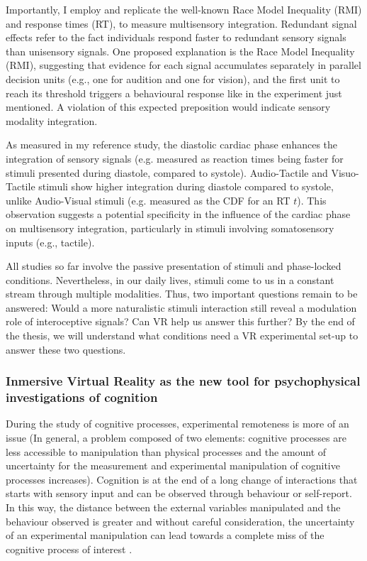 \documentclass[12pt,oneside,openright]{report}
\begin{document}
Importantly, I employ and replicate the well-known Race Model Inequality (RMI) and response times (RT), to measure multisensory integration. Redundant signal effects refer to the fact individuals respond faster to redundant sensory signals than unisensory signals. One proposed explanation is the Race Model Inequality (RMI), suggesting that evidence for each signal accumulates separately in parallel decision units (e.g., one for audition and one for vision), and the first unit to reach its threshold triggers a behavioural response like in the experiment just mentioned. A violation of this expected preposition would indicate sensory modality integration. 

As measured in my reference study, the diastolic cardiac phase enhances the integration of sensory signals (e.g. measured as reaction times being faster for stimuli presented during diastole, compared
to systole). Audio-Tactile and Visuo-Tactile stimuli show higher integration during diastole compared to systole, unlike Audio-Visual stimuli (e.g. measured as the CDF for an RT $t$). This observation suggests a potential specificity in the influence of the cardiac phase on multisensory integration, particularly in stimuli involving somatosensory inputs (e.g., tactile).

All studies so far involve the passive presentation of stimuli and phase-locked conditions. Nevertheless, in our daily lives, stimuli come to us in a constant stream through multiple modalities. Thus, two important questions remain to be answered: Would a more naturalistic stimuli interaction still reveal a modulation role of interoceptive signals? Can VR help us answer this further? By the end of the thesis, we will understand what conditions need a VR experimental set-up to answer these two questions. 







\subsubsection*{Inmersive Virtual Reality as the new tool for psychophysical investigations of cognition}


 During the study of cognitive processes, experimental remoteness is more of an issue (In general, a problem composed of two elements: cognitive processes are less accessible to manipulation than physical processes and the amount of uncertainty for the measurement and experimental manipulation of cognitive processes increases). Cognition is at the end of a long change of interactions that starts with sensory input and can be observed through behaviour or self-report. In this way, the distance between the external variables manipulated and the behaviour observed is greater and without careful consideration, the uncertainty of an experimental manipulation can lead towards a complete miss of the cognitive process of interest \parencite{WASKOM2019100}.
\end{document}
